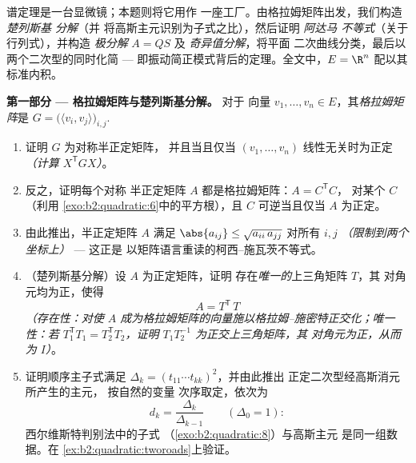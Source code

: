 \begin{problem}\label{pb:b2:quadratic:1}
谱定理是一台显微镜；本题则将它用作
一座工厂。由格拉姆矩阵出发，我们构造 \emph{楚列斯基
分解}（并
将高斯主元识别为子式之比），然后证明 \emph{阿达马
不等式}（关于行列式），并构造
\emph{极分解} $A =
QS$ 及 \emph{奇异值分解}，将平面
二次曲线分类，最后以两个二次型的同时化简 ---
即振动简正模式背后的定理。全文中，$E =
\R^n$ 配以其标准内积。

\medskip
\noindent\textbf{第一部分 --- 格拉姆矩阵与楚列斯基分解。} 对于
向量 $v_1, \dots, v_n \in E$，其\emph{格拉姆矩阵}是
$G = \bigl(\langle v_i, v_j\rangle\bigr)_{i,j}$.
\begin{enumerate}
  \item 证明 $G$ 为对称半正定矩阵，
        并且当且仅当 $(v_1, \dots, v_n)$
        线性无关时为正定 \emph{（计算 $X^{\mathsf T}GX$）}。
  \item 反之，证明每个对称
        半正定矩阵 $A$ 都是格拉姆矩阵：$A = C^{\mathsf T}C$，
        对某个 $C$（利用
        \cref{exo:b2:quadratic:6}中的平方根），且 $C$ 可逆当且仅当 $A$
        为正定。
  \item 由此推出，半正定矩阵 $A$ 满足
        $\abs{a_{ij}} \leq \sqrt{a_{ii}\,a_{jj}}$ 对所有 $i,
        j$ \emph{（限制到两个坐标上）} --- 这正是
        以矩阵语言重读的柯西–施瓦茨不等式。
  \item （楚列斯基分解）设 $A$ 为正定矩阵，证明
        存在\emph{唯一的}上三角矩阵 $T$，其
        对角元均为正，使得
        \[
        A = T^{\mathsf T}\,T
        \]
        \emph{（存在性：对使
        $A$ 成为格拉姆矩阵的向量施以格拉姆–施密特正交化；唯一性：若
        $T_1^{\mathsf T}T_1 = T_2^{\mathsf T}T_2$，证明
        $T_1T_2^{-1}$ 为正交上三角矩阵，其
        对角元为正，从而为 $I$）}。
  \item 证明顺序主子式满足
        $\Delta_k = (t_{11}\cdots t_{kk})^2$，并由此推出
        正定二次型经高斯消元所产生的主元，
        按自然的变量
        次序取定，依次为
        \[
        d_k = \frac{\Delta_k}{\Delta_{k-1}}
        \qquad (\Delta_0 = 1) :
        \]
        西尔维斯特判别法中的子式
        （\cref{exo:b2:quadratic:8}）与高斯主元
        是同一组数据。在
        \cref{ex:b2:quadratic:tworoads}上验证。
\end{enumerate}


\end{problem}
